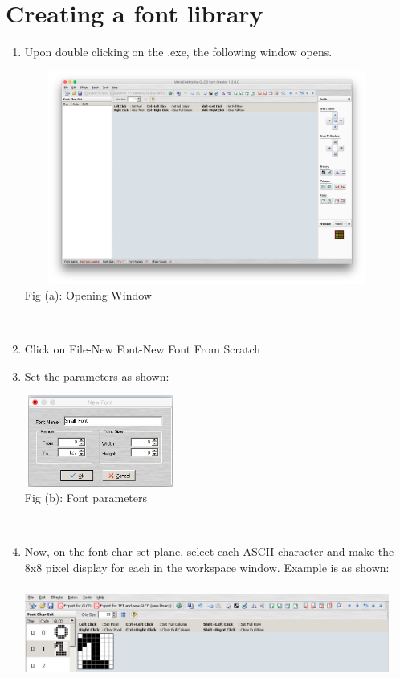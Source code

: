 \documentclass{article}
\begin{document}
\section{Creating a font library}
\begin{enumerate}
    \item Upon double clicking on the .exe, the following window opens.
\begin{center}
\includegraphics[width=12cm, height=7cm]{Screens/FontCreatorWindow} \\
\caption{Fig (a): Opening Window} \\
\end{center}
    \item Click on File-\>New Font-\>New Font From Scratch
    \item Set the parameters as shown:
\begin{center}
\includegraphics[width=5cm, height=3cm]{Screens/FontSetup} \\
\caption{Fig (b): Font parameters} \\
\end{center}
    \item Now, on the font char set plane, select each ASCII character and make the 8x8 pixel display for each in the workspace window. Example is as shown:\begin{center}
\includegraphics[width=12cm, height=3cm]{Screens/FontMaking} \\

\end{center}
\end{enumerate}
\end{document}
